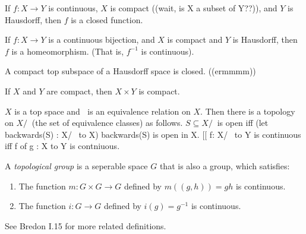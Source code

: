 \documentclass[11pt,leqno,oneside]{amsart}
\begin{document}
\begin{cor}
	If $f : X \to Y$ is continuous, $X$ is compact ((wait, is X a subset of Y??)), and $Y$ is Hausdorff, then $f$ is a closed function.
\end{cor}
\begin{cor}
	If $f : X \to Y$ is a continuous bijection, and $X$ is compact and $Y$ is Hausdorff, then $f$ is a homeomorphism. (That is, $f^{-1}$ is continuous).
\end{cor}
\begin{thm}
	A compact top subspace of a Hausdorff space is closed. ((ermmmm))
\end{thm}
\begin{thm}
	If $X$ and $Y$ are compact, then $X \times Y$ is compact.
\end{thm}
\begin{thm}
	$X$ is a top space and $~$ is an equivalence relation on $X$.  Then there is a topology on $X/~$ (the set of equivalence classes) as follows.  $S \subseteq X/~$ is open iff (let backwards(S) : X/~ to X) backwards(S) is open in X.  [[ f: X/~ to Y is continuous iff f of g : X to Y is contniuous.
\end{thm}
\begin{defn}
	A \emph{topological group} is a seperable space $G$ that is also a group, which satisfies:
	\begin{enumerate}
		\item The function $m : G \times G \to G$ defined by $m((g,h)) = gh$ is continuous.
		\item The function $i : G \to G$ defined by $i(g) = g^{-1}$ is continuous.
	\end{enumerate}
	See Bredon I.15 for more related definitions.
\end{defn}
\end{document}
